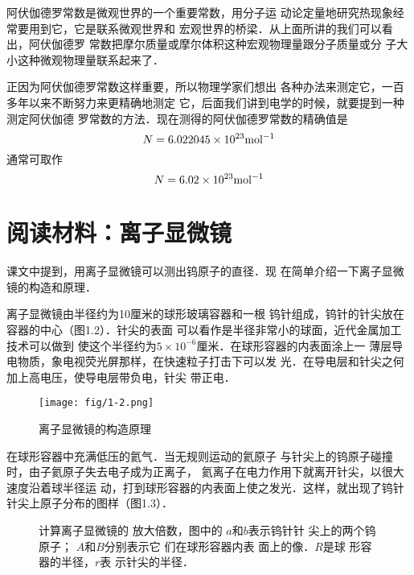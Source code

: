     阿伏伽德罗常数是微观世界的一个重要常数，用分子运
动论定量地研究热现象经常要用到它，它是联系微观世界和
宏观世界的桥梁．从上面所讲的我们可以看出，阿伏伽德罗
常数把摩尔质量或摩尔体积这种宏观物理量跟分子质量或分
子大小这种微观物理量联系起来了．

    正因为阿伏伽德罗常数这样重要，所以物理学家们想出
各种办法来测定它，一百多年以来不断努力来更精确地测定
它，后面我们讲到电学的时候，就要提到一种测定阿伏伽德
罗常数的方法．现在测得的阿伏伽德罗常数的精确值是
\[N=6.022045\times 10^{23}{\rm mol^{-1}} \]
通常可取作
\[N=6.02\times 10^{23}{\rm mol^{-1}} \]

\section*{阅读材料：离子显微镜}
    课文中提到，用离子显微镜可以测出钨原子的直径．现
在简单介绍一下离子显微镜的构造和原理．

    离子显微镜由半径约为10厘米的球形玻璃容器和一根
钨针组成，钨针的针尖放在容器的中心（图1.2）．针尖的表面
可以看作是半径非常小的球面，近代金属加工技术可以做到
使这个半径约为$5\times 10^{-6}$厘米．在球形容器的内表面涂上一
薄层导电物质，象电视荧光屏那样，在快速粒子打击下可以发
光．在导电层和针尖之何加上高电压，使导电层带负电，针尖
带正电．

\begin{figure}
\centering
\texttt{[image: fig/1-2.png]}
\caption{离子显微镜的构造原理
}
\end{figure}


    在球形容器中充满低压的氦气．当无规则运动的氦原子
与针尖上的钨原子碰撞时，由子氦原子失去电子成为正离子，
氦离子在电力作用下就离开针尖，以很大速度沿着球半径运
动，打到球形容器的内表面上使之发光．这样，就出现了钨针
针尖上原子分布的图样（图1.3）．

\begin{figure}
\centering
\caption{计算离子显微镜的
放大倍数，图中的
$a$和$b$表示钨针针
尖上的两个钨原子；
$A$和$B$分别表示它
们在球形容器内表
面上的像．$R$是球
形容器的半径，$r$表
示针尖的半径．
}
\end{figure}

